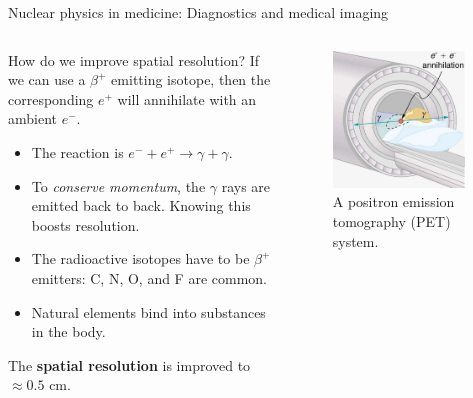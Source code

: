 \documentclass{beamer}
\begin{document}
\begin{frame}{Nuclear physics in medicine: Diagnostics and medical imaging}
\begin{columns}[T]
\begin{column}{0.5\textwidth}
\footnotesize
How do we improve spatial resolution?  If we can use a $\beta^{+}$ emitting isotope, then the corresponding $e^{+}$ will annihilate with an ambient $e^{-}$.
\begin{itemize}
\item The reaction is $e^{-} + e^{+} \rightarrow \gamma + \gamma$.
\item To \textit{conserve momentum}, the $\gamma$ rays are emitted back to back.  Knowing this boosts resolution.
\item The radioactive isotopes have to be $\beta^{+}$ emitters: C, N, O, and F are common.
\item Natural elements bind into substances in the body.
\end{itemize}
The \textbf{spatial resolution} is improved to $\approx 0.5$ cm.
\end{column}
\begin{column}{0.5\textwidth}
\begin{figure}
\centering
\includegraphics[width=0.95\textwidth]{figures/PET.png}
\caption{\label{fig:medicine_3} A positron emission tomography (PET) system.}
\end{figure}
\end{column}
\end{columns}
\end{frame}
\end{document}
